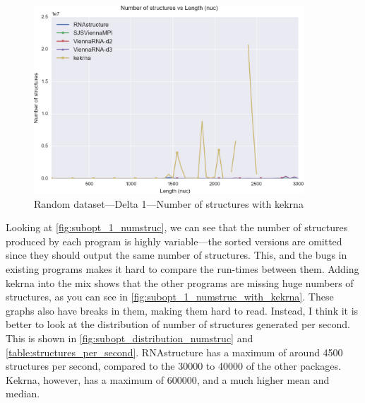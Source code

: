 \documentclass{cshonours}
\begin{document}
\begin{figure}[p]
\centering
\includegraphics[width=0.9\textwidth]{res/subopt_1_numstruc_with_kekrna.png}
\caption{Random dataset---Delta 1---Number of structures with kekrna}
\label{fig:subopt_1_numstruc_with_kekrna}
\end{figure}

Looking at \autoref{fig:subopt_1_numstruc}, we can see that the number of structures produced by each program is highly variable---the sorted versions are omitted since they should output the same number of structures. This, and the bugs in existing programs makes it hard to compare the run-times between them. Adding kekrna into the mix shows that the other programs are missing huge numbers of structures, as you can see in \autoref{fig:subopt_1_numstruc_with_kekrna}. These graphs also have breaks in them, making them hard to read. Instead, I think it is better to look at the distribution of number of structures generated per second. This is shown in \autoref{fig:subopt_distribution_numstruc} and \autoref{table:structures_per_second}. RNAstructure has a maximum of around 4500 structures per second, compared to the 30000 to 40000 of the other packages. Kekrna, however, has a maximum of 600000, and a much higher mean and median.
\end{document}
